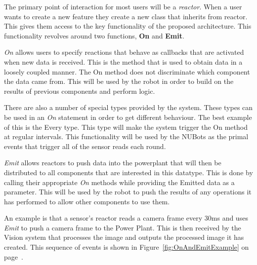 \documentclass[english,12pt]{scrartcl}
\begin{document}
			The primary point of interaction for most users will be a \emph{\gls{reactor}}.
			When a user wants to create a new feature they create a new class that inherits from \gls{reactor}.
			This gives them access to the key functionality of the proposed architecture. This functionality revolves around two functions, \textbf{On} and \textbf{Emit}.
			
			\emph{On} allows users to specify \glspl{reaction} that behave as callbacks that are activated when new data is received.
			This is the method that is used to obtain data in a loosely coupled manner.
			The On method does not discriminate which component the data came from.
			This will be used by the robot in order to build on the results of previous components and perform logic.
					
			There are also a number of special types provided by the system.
			These types can be used in an \emph{On} statement in order to get different behaviour.
			The best example of this is the Every type. This type will make the system trigger the On method at regular intervals.
			This functionality will be used by the NUBots as the primal events that trigger all of the sensor reads each round.
			
			\emph{Emit} allows \glspl{reactor} to push data into the \gls{powerplant} that will then be distributed to all components that are interested in this datatype. This is done by calling their appropriate \emph{On} methods while providing the Emitted data as a parameter.
			This will be used by the robot to push the results of any operations it has performed to allow other components to use them.
			
			An example is that a sensor's reactor reads a camera frame every 30ms and uses \emph{Emit} to push a camera frame to the Power Plant. This is then received by the Vision system that processes the image and outputs the processed image it has created. This sequence of events is shown in Figure~\ref{fig:OnAndEmitExample} on page~\pageref{fig:OnAndEmitExample}.
			
\end{document}
